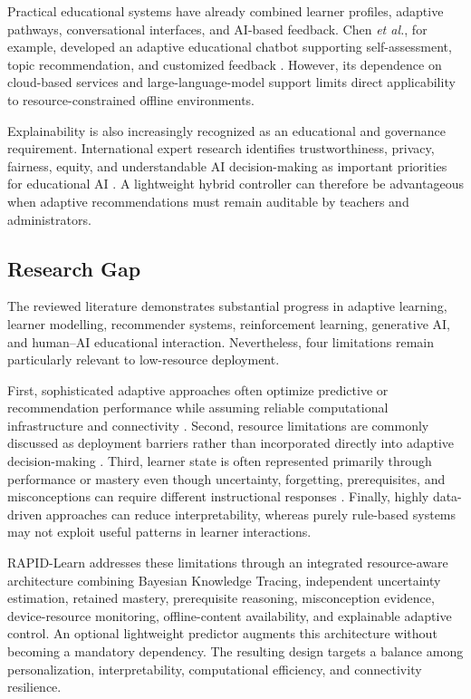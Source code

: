\documentclass[conference]{IEEEtran}
\begin{document}
Practical educational systems have already combined learner profiles,
adaptive pathways, conversational interfaces, and AI-based feedback.
Chen \textit{et al.}, for example, developed an adaptive educational
chatbot supporting self-assessment, topic recommendation, and customized
feedback \cite{chen2025}. However, its dependence on cloud-based
services and large-language-model support limits direct applicability to
resource-constrained offline environments.

Explainability is also increasingly recognized as an educational and
governance requirement. International expert research identifies
trustworthiness, privacy, fairness, equity, and understandable AI
decision-making as important priorities for educational AI
\cite{ifenthaler2024}. A lightweight hybrid controller can therefore be
advantageous when adaptive recommendations must remain auditable by
teachers and administrators.

\subsection{Research Gap}

The reviewed literature demonstrates substantial progress in adaptive
learning, learner modelling, recommender systems, reinforcement learning,
generative AI, and human--AI educational interaction. Nevertheless, four
limitations remain particularly relevant to low-resource deployment.

First, sophisticated adaptive approaches often optimize predictive or
recommendation performance while assuming reliable computational
infrastructure and connectivity
\cite{ruan2025,naseer2024,samat2026}. Second, resource limitations are
commonly discussed as deployment barriers rather than incorporated
directly into adaptive decision-making
\cite{hariyanto2025,mimoudi2025,ezzaim2024}. Third, learner state is
often represented primarily through performance or mastery even though
uncertainty, forgetting, prerequisites, and misconceptions can require
different instructional responses \cite{pelanek2025hard,pelanek2024rules}.
Finally, highly data-driven approaches can reduce interpretability,
whereas purely rule-based systems may not exploit useful patterns in
learner interactions.

RAPID-Learn addresses these limitations through an integrated
resource-aware architecture combining Bayesian Knowledge Tracing,
independent uncertainty estimation, retained mastery, prerequisite
reasoning, misconception evidence, device-resource monitoring,
offline-content availability, and explainable adaptive control. An
optional lightweight predictor augments this architecture without
becoming a mandatory dependency. The resulting design targets a balance
among personalization, interpretability, computational efficiency, and
connectivity resilience.
\end{document}
